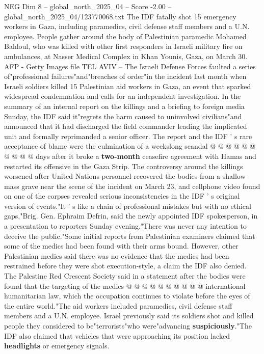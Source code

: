 \begin{textsample}{NEG Dim 8 – global\_north\_2025\_04 – Score -2.00 – global\_north\_2025\_04/123770068.txt}  \label{ex:f8_neg_087}
The IDF fatally shot 15 emergency workers in Gaza, including paramedics, civil defense staff members and a U.N. employee.
People gather around the body of Palestinian paramedic Mohamed Bahloul, who was killed with other first responders in Israeli military fire on ambulances, at Nasser Medical Complex in Khan Younis, Gaza, on March 30.
AFP - Getty Images file TEL AVIV -- The Israeli Defense Forces faulted a series of"professional failures"and"breaches of order"in the incident last month when Israeli soldiers killed 15 Palestinian aid workers in Gaza, an event that sparked widespread condemnation and calls for an independent investigation.
In the summary of an internal report on the killings and a briefing to foreign media Sunday, the IDF said it"regrets the harm caused to uninvolved civilians"and announced that it had discharged the field commander leading the implicated unit and formally reprimanded a senior officer.
The report and the IDF ' s rare acceptance of blame were the culmination of a weekslong scandal @ @ @ @ @ @ @ @ @ @ days after it broke a \textbf{two-month} ceasefire agreement with Hamas and restarted its offensive in the Gaza Strip.
The controversy around the killings worsened after United Nations personnel recovered the bodies from a shallow mass grave near the scene of the incident on March 23, and cellphone video found on one of the corpses revealed serious inconsistencies in the IDF ' s original version of events."It ' s like a chain of professional mistakes but with no ethical gaps,"Brig.
Gen.
Ephraim Defrin, said the newly appointed IDF spokesperson, in a presentation to reporters Sunday evening."There was never any intention to deceive the public."Some initial reports from Palestinian examiners claimed that some of the medics had been found with their arms bound.
However, other Palestinian medics said there was no evidence that the medics had been restrained before they were shot execution-style, a claim the IDF also denied.
The Palestine Red Crescent Society said in a statement after the bodies were found that the targeting of the medics @ @ @ @ @ @ @ @ @ @ international humanitarian law, which the occupation continues to violate before the eyes of the entire world."The aid workers included paramedics, civil defense staff members and a U.N. employee.
Israel previously said its soldiers shot and killed people they considered to be"terrorists"who were"advancing \textbf{suspiciously}."The IDF also claimed that vehicles that were approaching its position lacked \textbf{headlights} or emergency signals.

\end{textsample}
